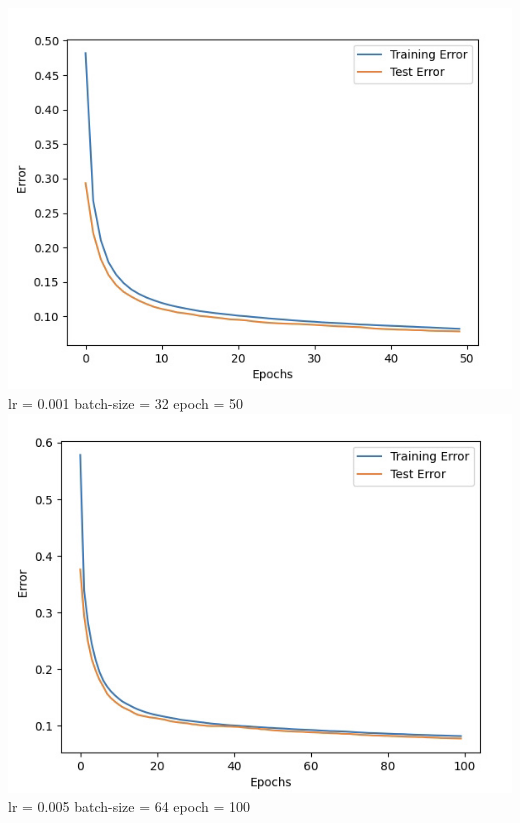 \documentclass[a4paper]{article}
\theoremstyle{definition}
\newenvironment{soln}{
    \leavevmode\color{blue}\ignorespaces
}{}
\begin{document}
\begin{enumerate}
\begin{soln}
\begin{center}
 \includegraphics[scale=0.4]{d=300e=50}\\
 lr = 0.001 batch-size = 32 epoch = 50 \\
 \includegraphics[scale=0.4]{d=300e=100}\\
 lr = 0.005 batch-size = 64 epoch = 100 \\
 

\end{center}
\end{soln}
\end{enumerate}
\end{document}
